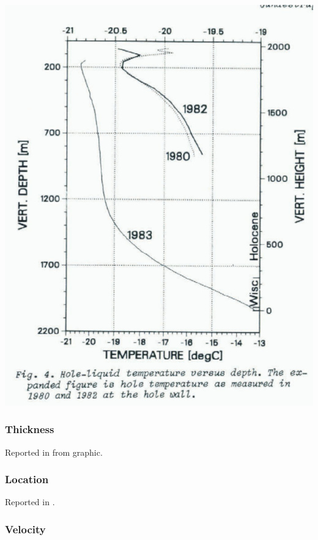 \documentclass[article,a4paper,times,11pt,twoside]{article}
\begin{document}
\begin{center}
\includegraphics[width=.9\linewidth]{dye_3/gundestrup_1984_fig4.png}
\end{center}

\subsubsection{Thickness}
\label{sec:org335933e}

Reported in \textcite{gundestrup_1984} from graphic.

\subsubsection{Location}
\label{sec:orgb380a19}

Reported in \textcite{gundestrup_1984}.

\subsubsection{Velocity}
\label{sec:org5668051}
\clearpage
\end{document}
